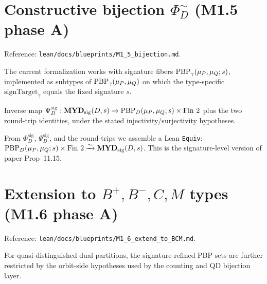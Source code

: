 \section{Constructive bijection $\Phi_D^{\sim}$ (M1.5 phase A)}

Reference: \texttt{lean/docs/blueprints/M1\_5\_bijection.md}.

\begin{definition}
  \label{def:PBPSet_sig}
  \leanok
  The current formalization works with signature fibers
  $\mathrm{PBP}_\gamma(\mu_P,\mu_Q;s)$, implemented as subtypes of
  $\mathrm{PBP}_\gamma(\mu_P,\mu_Q)$ on which the type-specific
  $\mathrm{signTarget}_\gamma$ equals the fixed signature $s$.
\end{definition}

\begin{theorem}
  \label{thm:Psi_D}
  Inverse map
  $\Psi_D^{\mathrm{sig}} : \mathbf{MYD}_{\mathrm{sig}}(D,s)
  \to \mathrm{PBP}_D(\mu_P,\mu_Q;s) \times \mathrm{Fin}\ 2$ plus the two
  round-trip identities, under the stated injectivity/surjectivity
  hypotheses.
\end{theorem}

\begin{theorem}
  \label{thm:Phi_D_equiv}
  \leanok
  From $\Phi_D^{\mathrm{sig}}$, $\Psi_D^{\mathrm{sig}}$, and the
  round-trips we assemble a Lean \texttt{Equiv}:
  $\mathrm{PBP}_D(\mu_P,\mu_Q;s) \times \mathrm{Fin}\ 2
  \xrightarrow{\sim} \mathbf{MYD}_{\mathrm{sig}}(D,s)$.
  This is the signature-level version of paper Prop~11.15.
\end{theorem}


\section{Extension to $B^+, B^-, C, M$ types (M1.6 phase A)}

Reference: \texttt{lean/docs/blueprints/M1\_6\_extend\_to\_BCM.md}.

\begin{definition}
  \label{def:PBPSet_qd_sig}
  \leanok
  For quasi-distinguished dual partitions, the signature-refined PBP sets
  are further restricted by the orbit-side hypotheses used by the counting
  and QD bijection layer.
\end{definition}

